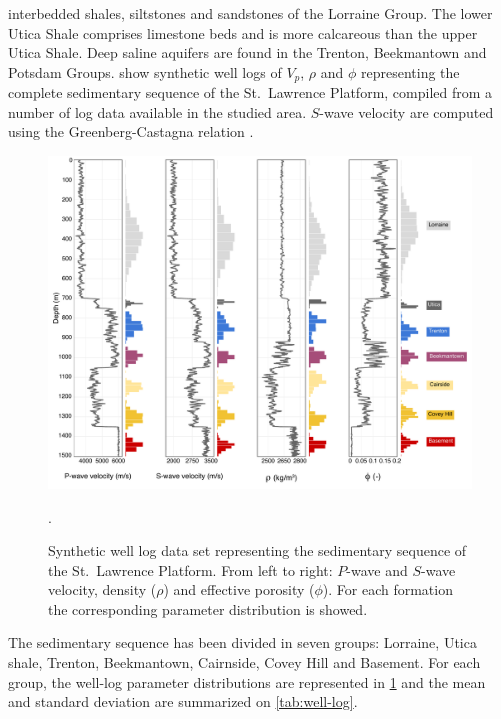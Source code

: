 interbedded shales, siltstones and sandstones of the Lorraine Group. The lower
Utica Shale comprises limestone beds and is more calcareous than the upper Utica
Shale. Deep saline aquifers are found in the Trenton, Beekmantown and Potsdam
Groups.  show synthetic well logs of $V_p$, $\rho$ and $\phi$
representing the complete sedimentary sequence of the St.\ Lawrence Platform,
compiled from a number of log data available in the studied area. $S$-wave
velocity are computed using the Greenberg-Castagna relation
\citep{Greenberg1992}.
\begin{figure}[!ht]
\centering
\includegraphics[width=1\textwidth]{fig/well-log.pdf}
\caption{Synthetic well log data set representing the sedimentary sequence of
the St.\ Lawrence Platform. From left to right: $P$-wave and $S$-wave velocity,
density ($\rho$) and effective porosity ($\phi$). For each formation the
corresponding parameter distribution is showed.}
\label{fig:well-log}.
\end{figure}
The sedimentary sequence has been divided in seven groups: Lorraine, Utica
shale, Trenton, Beekmantown, Cairnside, Covey Hill and Basement. For each group,
the well-log parameter distributions are represented in \cref{fig:well-log} and
the mean and standard deviation are summarized on \cref{tab:well-log}.
